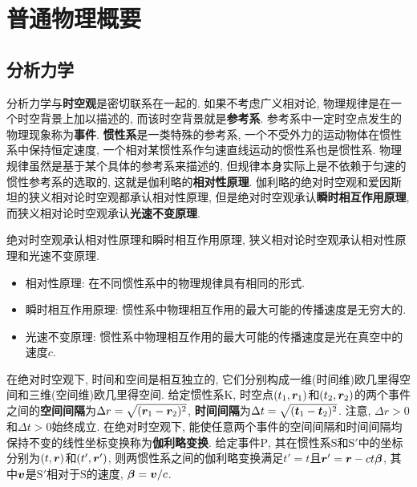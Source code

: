 \chapter[普通物理概要]{普通物理概要}
\newpage
\section[分析力学]{分析力学}\label{分析力学}
分析力学与\textbf{时空观}是密切联系在一起的. 如果不考虑广义相对论, 物理规律是在一个时空背景上加以描述的, 而该时空背景就是\textbf{参考系}. 参考系中一定时空点发生的物理现象称为\textbf{事件}. \textbf{惯性系}是一类特殊的参考系, 一个不受外力的运动物体在惯性系中保持恒定速度, 一个相对某惯性系作匀速直线运动的惯性系也是惯性系. 物理规律虽然是基于某个具体的参考系来描述的, 但规律本身实际上是不依赖于匀速的惯性参考系的选取的, 这就是伽利略的\textbf{相对性原理}. 伽利略的绝对时空观和爱因斯坦的狭义相对论时空观都承认相对性原理, 但是绝对时空观承认\textbf{瞬时相互作用原理}, 而狭义相对论时空观承认\textbf{光速不变原理}.
\begin{postulate}[时空观的基本假设]\label{pos:时空观的基本假设}
    绝对时空观承认相对性原理和瞬时相互作用原理, 狭义相对论时空观承认相对性原理和光速不变原理.
    \begin{itemize}
        \item 相对性原理: 在不同惯性系中的物理规律具有相同的形式.
        \item 瞬时相互作用原理: 惯性系中物理相互作用的最大可能的传播速度是无穷大的.
        \item 光速不变原理: 惯性系中物理相互作用的最大可能的传播速度是光在真空中的速度$ c $.
    \end{itemize}
\end{postulate}
在绝对时空观下, 时间和空间是相互独立的, 它们分别构成一维(时间维)欧几里得空间和三维(空间维)欧几里得空间. 给定惯性系$ \mathrm{K} $, 时空点$ (t_1,\vb*{r}_1) $和$ (t_2,\vb*{r}_2) $的两个事件之间的\textbf{空间间隔}为$ \Delta r = \sqrt{(\vb*{r}_1-\vb*{r}_2)^2} $, \textbf{时间间隔}为$ \Delta t = \sqrt{(\vb*{t}_1-\vb*{t}_2)^2} $. 注意, $ \Delta r > 0 $和$ \Delta t > 0 $始终成立. 在绝对时空观下, 能使任意两个事件的空间间隔和时间间隔均保持不变的线性坐标变换称为\textbf{伽利略变换}. 给定事件$ \mathrm{P} $, 其在惯性系$ \mathrm{S} $和$ \mathrm{S}' $中的坐标分别为$ (t,\vb*{r}) $和$ (t',\vb*{r}') $, 则两惯性系之间的伽利略变换满足$ t'=t $且$ \vb*{r}'=\vb*{r}-ct\vb*{\beta} $, 其中$ \vb*{v} $是$ \mathrm{S}' $相对于$ \mathrm{S} $的速度, $ \vb*{\beta}=\vb*{v}/c $.


